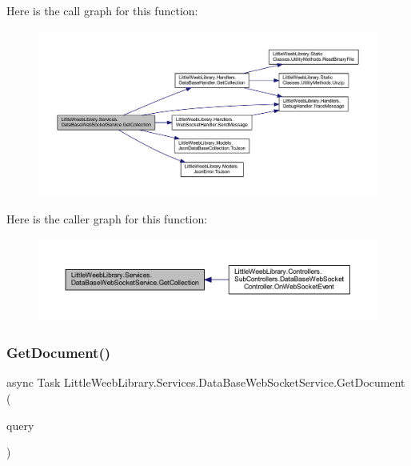Here is the call graph for this function\+:\nopagebreak
\begin{figure}[H]
\begin{center}
\leavevmode
\includegraphics[width=350pt]{class_little_weeb_library_1_1_services_1_1_data_base_web_socket_service_aef8bdd650778c72d639f1e89c1d6dcad_cgraph}
\end{center}
\end{figure}
Here is the caller graph for this function\+:\nopagebreak
\begin{figure}[H]
\begin{center}
\leavevmode
\includegraphics[width=350pt]{class_little_weeb_library_1_1_services_1_1_data_base_web_socket_service_aef8bdd650778c72d639f1e89c1d6dcad_icgraph}
\end{center}
\end{figure}
\mbox{\label{class_little_weeb_library_1_1_services_1_1_data_base_web_socket_service_aa51350396b2aa1634a680c94bebdc64c}} 
\subsubsection{\texorpdfstring{Get\+Document()}{GetDocument()}}
{\footnotesize\ttfamily async Task Little\+Weeb\+Library.\+Services.\+Data\+Base\+Web\+Socket\+Service.\+Get\+Document (\begin{DoxyParamCaption}\item[{J\+Object}]{query }\end{DoxyParamCaption})}



